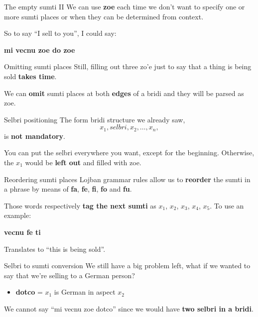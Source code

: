 \begin{frame}{The empty sumti II}
    We can use \textbf{zo\textquotesingle e} each time we don't want to specify one or more sumti places or when they can be determined from context.

    \pause
    So to say ``I sell to you'', I could say:
    \begin{center}
        \textbf{mi vecnu zo\textquotesingle e do zo\textquotesingle e}
    \end{center}
\end{frame}

\begin{frame}{Omitting sumti places}
    Still, filling out three zo'e just to say that a thing is being sold \textbf{takes time}.

    \pause
    We can \textbf{omit} sumti places at both \textbf{edges} of a bridi and they will be parsed as zo\textquotesingle e.
\end{frame}

\begin{frame}{Selbri positioning}
    The form bridi structure we already saw,
    \[x_1, selbri, x_2,\ldots,x_n,\]
    is \textbf{not mandatory}.

    You can put the selbri everywhere you want, except for the beginning. Otherwise, the $x_1$ would be \textbf{left out} and filled with zo\textquotesingle e.
\end{frame}

\begin{frame}{Reordering sumti places}
    Lojban grammar rules allow us to \textbf{reorder} the sumti in a phrase by means of \textbf{fa}, \textbf{fe}, \textbf{fi}, \textbf{fo} and \textbf{fu}.

    Those words respectively \textbf{tag the next sumti} as $x_1$, $x_2$, $x_3$, $x_4$, $x_5$. To use an example:
    \begin{center}
        \textbf{vecnu fe ti}
    \end{center}
    Translates to ``this is being sold''.
\end{frame}

\begin{frame}{Selbri to sumti conversion}
    We still have a big problem left, what if we wanted to say that we're selling to a German person?

    \begin{itemize}
        \item \textbf{dotco} = $x_1$ is German in aspect $x_2$
    \end{itemize}

    We cannot say ``mi vecnu zo\textquotesingle e dotco'' since we would have \textbf{two selbri in a bridi}.
\end{frame}

